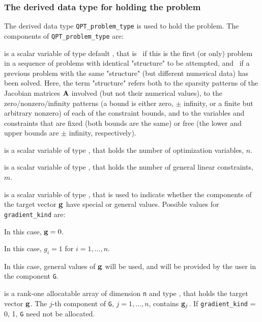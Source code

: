 \documentclass{galahad}
\begin{document}
\subsubsection{The derived data type for holding the problem}\label{typeprob}
The derived data type {\tt QPT\_problem\_type} is used to hold 
the problem. The components of 
{\tt QPT\_problem\_type} 
are:

\begin{description}

 is a scalar variable of type default \logical, 
 that is \true\ if this is the first (or only) problem in a sequence of 
 problems with identical "structure" to be attempted, and \false\ if 
 a previous problem with the same "structure" (but different
 numerical data) has been solved. Here, the term "structure" refers both to 
 the sparsity patterns of the Jacobian matrices ${\mathbf{A}}$ involved 
 (but not their numerical values), to the zero/nonzero/infinity patterns 
 (a bound is either zero, $\pm$ infinity, or a finite but arbitrary 
 nonzero) of each of the constraint bounds, and to the variables and constraints
 that are fixed (both bounds are the same) or free (the lower and upper
 bounds are $\pm$ infinity, respectively).

 is a scalar variable of type \integer, 
 that holds the number of optimization variables, $n$.  
              
 is a scalar variable of type \integer, 
 that holds the number of general linear constraints, $m$.
              
 is a scalar variable of type \integer, 
that is used to indicate whether the components of the target vector ${\mathbf{g}}$ 
have special or general values. Possible values for {\tt gradient\_kind} are:
\begin{description}
  In this case, ${\mathbf{g}} = 0$.

 In this case, $g_{i} = 1$ for $i = 1, \ldots ,n$.

 In this case, general values of ${\mathbf{g}}$ will be used,
     and will be provided by the user in the component {\tt G}.
\end{description}

 is a rank-one allocatable array of dimension {\tt n} and type 
\realdp, that holds the target vector ${\mathbf{g}}$.
The $j$-th component of 
{\tt G}, $j = 1,  \ldots ,  n$, contains ${\mathbf{g}}_{j}$.
If {\tt gradient\_kind} {= 0, 1}, {\tt G} need not be allocated.


\end{description}
\end{document}
